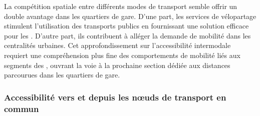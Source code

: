 \begin{refsegment}
La compétition spatiale entre différents modes de transport semble offrir un double avantage dans les quartiers de gare. D'une part, les services de vélopartage stimulent l'utilisation des transports publics en fournissant une solution efficace pour les . D'autre part, ils contribuent à alléger la demande de mobilité dans les centralités urbaines. Cet approfondissement sur l'accessibilité intermodale requiert une compréhension plus fine des comportements de mobilité liés aux segments des , ouvrant la voie à la prochaine section dédiée aux distances parcourues dans les quartiers de gare.%
        
\subsubsection*{Accessibilité vers et depuis les nœuds de transport en commun
    \label{chap2:accessibilite-premiers-derniers-km}
    }
    

\end{refsegment}
